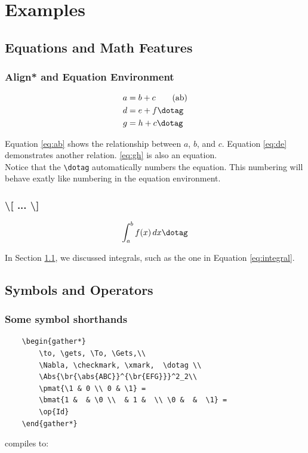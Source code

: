 \chapter{Examples}
\section{Equations and Math Features}\label{sec:equations}

\subsection{Align* and Equation Environment}
\begin{align*}
    a &= b + c \tag{ab} \label{eq:ab} \\
    d &= e + f \dotag \label{eq:de} \\
    g &= h + c \dotag \label{eq:gh}
\end{align*}

Equation \ref{eq:ab} shows the relationship between $a$, $b$, and $c$. Equation \eqref{eq:de} demonstrates another relation. \eqref{eq:gh} is also an equation.\\
Notice that the \texttt{\textbackslash{dotag}} automatically numbers the equation. This numbering will behave exatly like numbering in the equation environment.

\subsection{\textbackslash[ ... \textbackslash]}\label{subsec:integral}
\[
    \int_{a}^{b} f(x) \,dx \dotag \label{eq:integral}
\]

In Section \ref{sec:equations}, we discussed integrals, such as the one in Equation \eqref{eq:integral}.

\section{Symbols and Operators}\label{sec:symbols}

\subsection{Some symbol shorthands}\label{subsec:arrows}

\begin{verbatim}
    \begin{gather*}
        \to, \gets, \To, \Gets,\\
        \Nabla, \checkmark, \xmark,  \dotag \\
        \Abs{\br{\abs{ABC}}^{\br{EFG}}}^2_2\\
        \pmat{\1 & 0 \\ 0 & \1} = 
        \bmat{1 &  & \0 \\  & 1 &  \\ \0 &  &  \1} =
        \op{Id}
    \end{gather*}
\end{verbatim}
compiles to:

